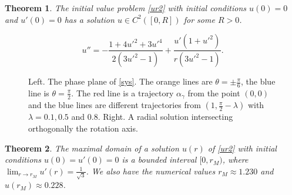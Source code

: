\documentclass[10pt,a4paper]{amsart}
\newtheorem{theorem}{Theorem}
\begin{document}
\begin{theorem}\label{t1}
The initial value problem \eqref{ur2} with initial conditions $u(0)=0$ and $u'(0)=0$ has a solution $u\in C^2([0,R])$ for some $R>0$. 
\end{theorem}

 \begin{equation}\label{ur3}
 u''=-\frac{1+4u'^2+3u'^4}{2(3u'^2-1)} +\frac{u'(1+u'^2)}{r (3u'^2-1)}.
 \end{equation}

 \begin{figure}[h]
\begin{center}
 \quad 
\end{center}
\caption{Left. The phase plane of \eqref{sys}. The orange lines are $\theta=\pm\frac{\pi}{6}$, the blue line is $\theta=\frac{\pi}{2}$. The red line is a trajectory $\alpha_\gamma$ from the point $(0,0)$ and the blue lines are different trajectories from $(1,\frac{\pi}{2}-\lambda)$ with $\lambda=0.1, 0.5$ and $0.8$.   Right. A radial solution intersecting  orthogonally the rotation axis.}\label{fig1}
\end{figure}

\begin{theorem}\label{t2} The maximal domain of a solution $u(r)$ of \eqref{ur2} with initial conditions $u(0)=u'(0)=0$ is   a bounded interval    $[0,r_M)$, where   $\lim_{r\to r_M}u'(r)=\frac{1}{\sqrt{3}}$. We also have the numerical values $r_M\approx 1.230$ and $u(r_M)\approx 0.228$.
\end{theorem}
\end{document}
